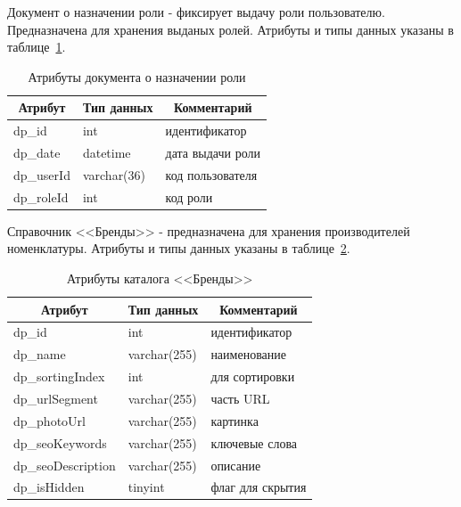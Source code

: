 Документ о назначении роли - фиксирует выдачу роли пользователю.
Предназначена для хранения выданых ролей.
Атрибуты и типы данных указаны в таблице~\ref{tab:DP_DOC_UserRoles}.

\begin{table}[!htb]
    \centering\small

    \caption{Атрибуты документа о назначении роли}
    \label{tab:DP_DOC_UserRoles}

    \begin{tabular}{|p{5cm}|p{2.5cm}|p{9cm}|}
        \hline
        \multicolumn{1}{|c|}{Атрибут}
        & \multicolumn{1}{c|}{Тип данных}
        & \multicolumn{1}{c|}{Комментарий}
        \\ \hline

        dp\_id & int & идентификатор \\ \hline
        dp\_date & datetime & дата выдачи роли \\ \hline
        dp\_userId & varchar(36) & код пользователя \\ \hline
        dp\_roleId & int & код роли \\ \hline
    \end{tabular}
\end{table}

Справочник <<Бренды>> - предназначена для хранения производителей номенклатуры.
Атрибуты и типы данных указаны в таблице~\ref{tab:DP_CTL_ItemBrands}.

\begin{table}[!htb]
    \centering\small

    \caption{Атрибуты каталога <<Бренды>>}
    \label{tab:DP_CTL_ItemBrands}

    \begin{tabular}{|p{5cm}|p{2.5cm}|p{9cm}|}
        \hline
        \multicolumn{1}{|c|}{Атрибут}
        & \multicolumn{1}{c|}{Тип данных}
        & \multicolumn{1}{c|}{Комментарий}
        \\ \hline

        dp\_id & int & идентификатор \\ \hline
        dp\_name & varchar(255) & наименование \\ \hline
        dp\_sortingIndex & int & для сортировки \\ \hline
        dp\_urlSegment & varchar(255) & часть URL \\ \hline
        dp\_photoUrl & varchar(255) & картинка\\ \hline
        dp\_seoKeywords & varchar(255) & ключевые слова \\ \hline
        dp\_seoDescription & varchar(255) & описание \\ \hline
        dp\_isHidden & tinyint & флаг для скрытия \\ \hline
    \end{tabular}
\end{table}

